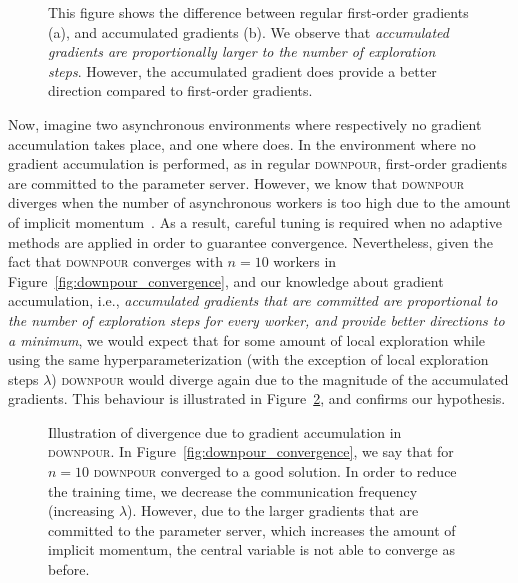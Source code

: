 \documentclass[wcp]{jmlr}
\begin{document}
\begin{figure}
  \centering
  \caption{This figure shows the difference between regular first-order gradients (a), and accumulated gradients (b). We observe that \emph{accumulated gradients are proportionally larger to the number of exploration steps}. However, the accumulated gradient does provide a better direction compared to first-order gradients.}
  \label{fig:agn_intuition}
\end{figure}

Now, imagine two asynchronous environments where respectively no gradient accumulation takes place, and one where does. In the environment where no gradient accumulation is performed, as in regular \textsc{downpour}, first-order gradients are committed to the parameter server. However, we know that \textsc{downpour} diverges when the number of asynchronous workers is too high due to the amount of implicit momentum~\cite{implicitmomentum}. As a result, careful tuning is required when no adaptive methods are applied in order to guarantee convergence. Nevertheless, given the fact that \textsc{downpour} converges with $n = 10$ workers in Figure~\ref{fig:downpour_convergence}, and our knowledge about gradient accumulation, i.e., \emph{accumulated gradients that are committed are proportional to the number of exploration steps for every worker, and provide better directions to a minimum}, we would expect that for some amount of local exploration while using the same hyperparameterization (with the exception of local exploration steps $\lambda$) \textsc{downpour} would diverge again due to the magnitude of the accumulated gradients. This behaviour is illustrated in Figure~\ref{fig:downpour_accumulated_divergence}, and confirms our hypothesis.\\

\begin{figure}
  \centering
  \caption{Illustration of divergence due to gradient accumulation in \textsc{downpour}. In Figure~\ref{fig:downpour_convergence}, we say that for $n = 10$ \textsc{downpour} converged to a good solution. In order to reduce the training time, we decrease the communication frequency (increasing $\lambda$). However, due to the larger gradients that are committed to the parameter server, which increases the amount of implicit momentum, the central variable is not able to converge as before.}
  \label{fig:downpour_accumulated_divergence}
\end{figure}
\end{document}
